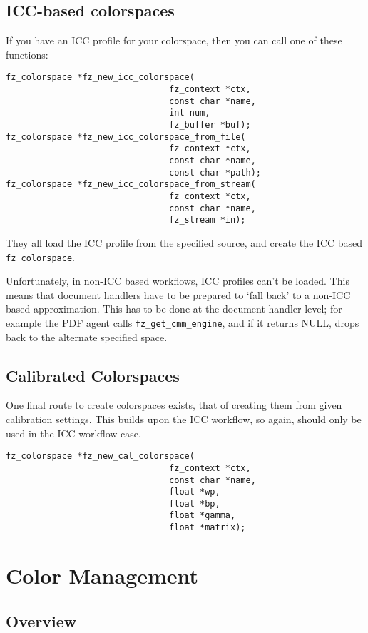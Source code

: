 \documentclass[oneside]{book}
\begin{document}
\section{ICC-based colorspaces}

If you have an ICC profile for your colorspace, then you can call one of these functions:

\begin{lstlisting}
fz_colorspace *fz_new_icc_colorspace(
								fz_context *ctx,
								const char *name,
								int num,
								fz_buffer *buf);
fz_colorspace *fz_new_icc_colorspace_from_file(
								fz_context *ctx,
								const char *name,
								const char *path);
fz_colorspace *fz_new_icc_colorspace_from_stream(
								fz_context *ctx,
								const char *name,
								fz_stream *in);
\end{lstlisting}

They all load the ICC profile from the specified source, and create the ICC based \texttt{fz\_colorspace}.

Unfortunately, in non-ICC based workflows, ICC profiles can't be loaded. This means that document handlers have to be prepared to `fall back' to a non-ICC based approximation. This has to be done at the document handler level; for example the PDF agent calls \texttt{fz\_get\_cmm\_engine}, and if it returns NULL, drops back to the alternate specified space.

\section{Calibrated Colorspaces}

One final route to create colorspaces exists, that of creating them from given calibration settings. This builds upon the ICC workflow, so again, should only be used in the ICC-workflow case.

\begin{lstlisting}
fz_colorspace *fz_new_cal_colorspace(
								fz_context *ctx,
								const char *name,
								float *wp,
								float *bp,
								float *gamma,
								float *matrix);
\end{lstlisting}

\chapter{Color Management}
\label{ColorManagement}

\section{Overview}
\end{document}
